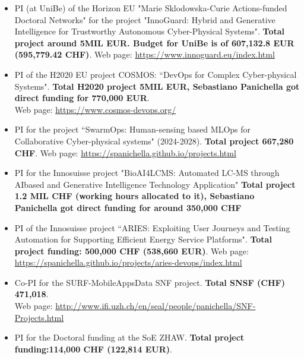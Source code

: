 \documentclass[11pt]{article}
\begin{document}
\begin{itemize}
  \item PI (at UniBe) of the Horizon EU  "Marie Sklodowska-Curie Actions-funded Doctoral Networks" for the project "InnoGuard: Hybrid and Generative Intelligence for Trustworthy Autonomous Cyber-Physical Systems".
\textbf{Total project around 5MIL EUR. Budget for UniBe is of 607,132.8 EUR (595,779.42 CHF)}. Web page: \href{https://www.innoguard.eu/index.html}{https://www.innoguard.eu/index.html}
\vspace{-2.5mm}
  \item PI of the H2020 EU project COSMOS: ``DevOps for Complex Cyber-physical Systems". \textbf{Total H2020 project 5MIL EUR, Sebastiano Panichella got direct funding for 770,000 EUR}. \\Web page: \href{https://www.cosmos-devops.org/}{https://www.cosmos-devops.org/}
\vspace{-2.5mm}
\item PI for   the project ``SwarmOps: Human-sensing based MLOps for Collaborative Cyber-physical systems" (2024-2028).  \textbf{Total project 667,280 CHF}.  Web page: \href{https://spanichella.github.io/projects.html}{https://spanichella.github.io/projects.html}
\vspace{-2.5mm}
\item PI for the Innosuisse project  "BioAI4LCMS: Automated LC-MS through AIbased and Generative Intelligence Technology Application" \textbf{Total project 1.2 MIL CHF (working hours allocated to it), Sebastiano Panichella got direct funding for around 350,000 CHF}
\vspace{-2.5mm}
  \item PI of the Innosuisse project ``ARIES: Exploiting User Journeys and Testing Automation for Supporting Efficient Energy Service Platforms". \textbf{Total project funding: \textbf{500,000 CHF} (538,660 EUR)}. Web page: \href{https://spanichella.github.io/projects/aries-devops/index.html}{https://spanichella.github.io/projects/aries-devops/index.html}
\vspace{-2.5mm}
  \item Co-PI for
   the SURF-MobileAppsData SNF project. \textbf{Total SNSF (CHF) 471,018}. \\Web page: \href{http://www.ifi.uzh.ch/en/seal/people/panichella/SNF-Projects.html}{http://www.ifi.uzh.ch/en/seal/people/panichella/SNF-Projects.html}
\vspace{-2.5mm}
   \item PI for the Doctoral funding at the SoE ZHAW. \textbf{Total project funding:\textbf{114,000 CHF} (122,814 EUR)}.

\end{itemize}
\end{document}
